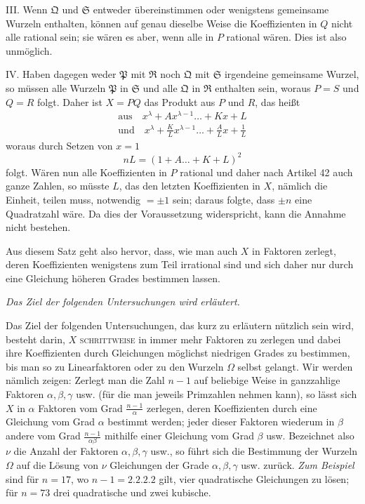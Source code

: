 III. Wenn \(\mathfrak Q\) und \(\mathfrak S\) entweder übereinstimmen oder wenigstens gemeinsame Wurzeln enthalten, können auf genau dieselbe Weise die Koeffizienten in \(Q\) nicht alle rational sein; sie wären es aber, wenn alle in \(P\) rational wären. Dies ist also unmöglich.

IV. Haben dagegen weder \(\mathfrak P\) mit \(\mathfrak R\) noch \(\mathfrak Q\) mit \(\mathfrak S\) irgendeine gemeinsame
Wurzel, so müssen alle Wurzeln \(\mathfrak P\) in \(\mathfrak S\) und alle \(\mathfrak Q\) in \(\mathfrak R\) enthalten sein, woraus \(P=S\) und \(Q=R\) folgt. Daher ist \(X=PQ\) das Produkt aus \(P\) und \(R\), das heißt \[\begin{gathered}
\text{aus}\quad x^\lambda+Ax^{\lambda-1}\ldots+Kx+L\\
\text{und}\quad x^\lambda+\frac KLx^{\lambda-1}\ldots+\frac ALx+\frac1L
\end{gathered}\] woraus durch Setzen von \(x=1\) \[nL=(1+A\ldots+K+L)^2\] folgt. Wären nun alle Koeffizienten in \(P\) rational und daher nach Artikel 42 auch ganze Zahlen, so müsste \(L\), das den letzten Koeffizienten in \(X\), nämlich die Einheit, teilen muss, notwendig \(=\pm1\) sein; daraus folgte, dass \(\pm n\) eine Quadratzahl wäre. Da dies der Voraussetzung widerspricht, kann die Annahme nicht bestehen.

Aus diesem Satz geht also hervor, dass, wie man auch \(X\) in Faktoren zerlegt, deren Koeffizienten wenigstens zum Teil irrational sind und sich daher nur durch eine Gleichung höheren Grades bestimmen lassen.

\begin{center}\textit{Das Ziel der folgenden Untersuchungen wird erläutert.}\end{center}


Das Ziel der folgenden Untersuchungen, das kurz zu erläutern nützlich sein wird, besteht darin, \(X\) \textsc{schrittweise} in immer mehr Faktoren zu zerlegen und dabei ihre Koeffizienten durch Gleichungen möglichst niedrigen Grades zu bestimmen, bis man so zu Linearfaktoren oder zu den Wurzeln \(\Omega\) selbst gelangt. Wir werden nämlich zeigen: Zerlegt man die Zahl \(n-1\) auf beliebige Weise in ganzzahlige Faktoren \(\alpha,\allowbreak \beta,\allowbreak \gamma\) usw. (für die man jeweils Primzahlen nehmen kann), so lässt sich \(X\) in \(\alpha\) Faktoren vom Grad \(\frac{n-1}{\alpha}\) zerlegen, deren Koeffizienten durch eine Gleichung vom Grad \(\alpha\) bestimmt werden; jeder dieser Faktoren wiederum in \(\beta\) andere vom Grad \(\frac{n-1}{\alpha\beta}\) mithilfe einer Gleichung vom Grad \(\beta\) usw. Bezeichnet also \(\nu\) die Anzahl der Faktoren \(\alpha,\allowbreak \beta,\allowbreak \gamma\) usw., so führt sich die Bestimmung der Wurzeln \(\Omega\) auf die Lösung von \(\nu\) Gleichungen der Grade \(\alpha,\allowbreak \beta,\allowbreak \gamma\) usw. zurück. \textit{Zum Beispiel} sind für \(n=17\), wo \(n-1=2.2.2.2\) gilt, vier quadratische Gleichungen zu lösen; für \(n=73\) drei quadratische und zwei kubische.

